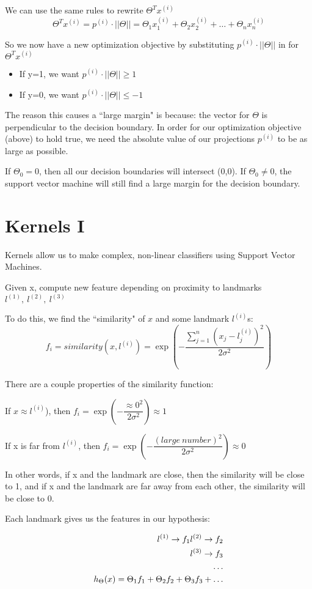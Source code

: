 We can use the same rules to rewrite $\Theta^Tx^{(i)}$
\[
\Theta^Tx^{(i)} = p^{(i)} \cdot ||\Theta || = \Theta_1x_1^{(i)} + \Theta_2x_2^{(i)} + \dots + \Theta_n x_n^{(i)}
\]

So we now have a new optimization objective by substituting $p^{(i)} \cdot ||\Theta ||$ in for $\Theta^Tx^{(i)}$
\begin{itemize}
\item If y=1, we want $p^{(i)} \cdot ||\Theta || \geq 1$
\item If y=0, we want $p^{(i)} \cdot ||\Theta || \leq -1$
\end{itemize}

The reason this causes a ``large margin" is because: the vector for $\Theta$ is perpendicular to the decision boundary. In order for our optimization objective (above) to hold true, we need the absolute value of our projections $p^{(i)}$ to be as large as possible.

If $\Theta_0 =0$, then all our decision boundaries will intersect (0,0). If $\Theta_0 \neq 0$, the support vector machine will still find a large margin for the decision boundary.

\section{Kernels I}
Kernels allow us to make complex, non-linear classifiers using Support Vector Machines.

Given x, compute new feature depending on proximity to landmarks $l^{(1)},\ l^{(2)},\ l^{(3)}$

To do this, we find the ``similarity" of $x$ and some landmark $l^{(i)}$s:
\[
f_i = similarity(x, l^{(i)}) = \exp(-\dfrac{\sum^n_{j=1}(x_j-l_j^{(i)})^2}{2\sigma^2})
\]

There are a couple properties of the similarity function:

If $x \approx l^{(i)}$), then $f_i = \exp(-\dfrac{\approx 0^2}{2\sigma^2}) \approx 1$

If x is far from $l^{(i)}$, then $f_i = \exp(-\dfrac{(large\ number)^2}{2\sigma^2}) \approx 0$

In other words, if x and the landmark are close, then the similarity will be close to 1, and if x and the landmark are far away from each other, the similarity will be close to 0.

Each landmark gives us the features in our hypothesis:


\begin{align*}l^{(1)} \rightarrow f_1 \newline l^{(2)} \rightarrow f_2 \\
 l^{(3)} \rightarrow f_3 \\
\dots \\
 h_\Theta(x) = \Theta_1f_1 + \Theta_2f_2 + \Theta_3f_3 + \dots
\end{align*}


